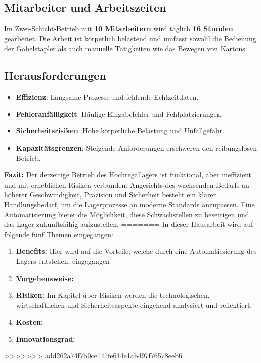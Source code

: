 \subsection*{Mitarbeiter und Arbeitszeiten}
Im Zwei-Schicht-Betrieb mit \textbf{10 Mitarbeitern} wird täglich \textbf{16 Stunden} gearbeitet. Die Arbeit ist körperlich belastend und umfasst sowohl die Bedienung der Gabelstapler als auch manuelle Tätigkeiten wie das Bewegen von Kartons.

\subsection*{Herausforderungen}
\begin{itemize}
	\item \textbf{Effizienz}: Langsame Prozesse und fehlende Echtzeitdaten.
	\item \textbf{Fehleranfälligkeit}: Häufige Eingabefehler und Fehlplatzierungen.
	\item \textbf{Sicherheitsrisiken}: Hohe körperliche Belastung und Unfallgefahr.
	\item \textbf{Kapazitätsgrenzen}: Steigende Anforderungen erschweren den reibungslosen Betrieb.
\end{itemize}

\textbf{Fazit:} Der derzeitige Betrieb des Hochregallagers ist funktional, aber ineffizient und mit erheblichen Risiken verbunden. Angesichts des wachsenden Bedarfs an höherer Geschwindigkeit, Präzision und Sicherheit besteht ein klarer Handlungsbedarf, um die Lagerprozesse an moderne Standards anzupassen. Eine Automatisierung bietet die Möglichkeit, diese Schwachstellen zu beseitigen und das Lager zukunftsfähig aufzustellen.
=======
In dieser Hausarbeit wird auf folgende fünf Themen eingegangen:
\begin{enumerate}
	\item \textbf{Benefits: }Hier wird auf die Vorteile, welche durch eine Automatiesierung des Lagers entstehen, eingegangen
	\item \textbf{Vorgehensweise:}
	\item \textbf{Risiken:} Im Kapitel über Risiken werden die technologischen, wirtschaftlichen und Sicherheitsaspekte eingehend analysiert und reflektiert.
	\item \textbf{Kosten:}
	\item \textbf{Innovationsgrad:}
\end{enumerate}
>>>>>>> add262a74f7b0ce141fe614e1ab497f76578eeb6
